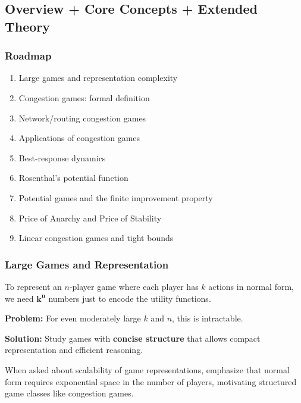 \subsection{Overview + Core Concepts + Extended Theory}

\subsubsection*{Roadmap}
\begin{enumerate}
  \item Large games and representation complexity
  \item Congestion games: formal definition
  \item Network/routing congestion games
  \item Applications of congestion games
  \item Best-response dynamics
  \item Rosenthal's potential function
  \item Potential games and the finite improvement property
  \item Price of Anarchy and Price of Stability
  \item Linear congestion games and tight bounds
\end{enumerate}

\bigseparator

\subsubsection{Large Games and Representation}

\begin{defbox}
To represent an $n$-player game where each player has $k$ actions in normal form, we need $\mathbf{k^n}$ numbers just to encode the utility functions.

\textbf{Problem:} For even moderately large $k$ and $n$, this is intractable.

\textbf{Solution:} Study games with \textbf{concise structure} that allows compact representation and efficient reasoning.
\end{defbox}

\begin{tipbox}
When asked about scalability of game representations, emphasize that normal form requires exponential space in the number of players, motivating structured game classes like congestion games.
\end{tipbox}

